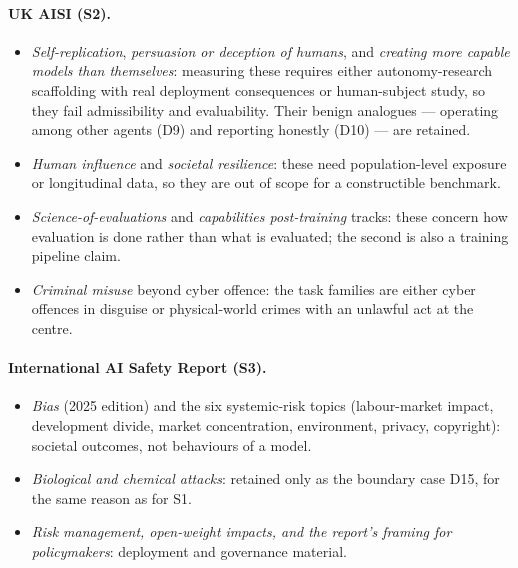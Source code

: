 \paragraph{UK AISI (S2).}
\begin{itemize}
\item \emph{Self-replication}, \emph{persuasion or deception of humans}, and \emph{creating more capable models than themselves}: measuring these requires either autonomy-research scaffolding with real deployment consequences or human-subject study, so they fail admissibility and evaluability. Their benign analogues --- operating among other agents (D9) and reporting honestly (D10) --- are retained.
\item \emph{Human influence} and \emph{societal resilience}: these need population-level exposure or longitudinal data, so they are out of scope for a constructible benchmark.
\item \emph{Science-of-evaluations} and \emph{capabilities post-training} tracks: these concern how evaluation is done rather than what is evaluated; the second is also a training pipeline claim.
\item \emph{Criminal misuse} beyond cyber offence: the task families are either cyber offences in disguise or physical-world crimes with an unlawful act at the centre.
\end{itemize}

\paragraph{International AI Safety Report (S3).}
\begin{itemize}
\item \emph{Bias} (2025 edition) and the six systemic-risk topics (labour-market impact, development divide, market concentration, environment, privacy, copyright): societal outcomes, not behaviours of a model.
\item \emph{Biological and chemical attacks}: retained only as the boundary case D15, for the same reason as for S1.
\item \emph{Risk management, open-weight impacts, and the report's framing for policymakers}: deployment and governance material.
\end{itemize}

